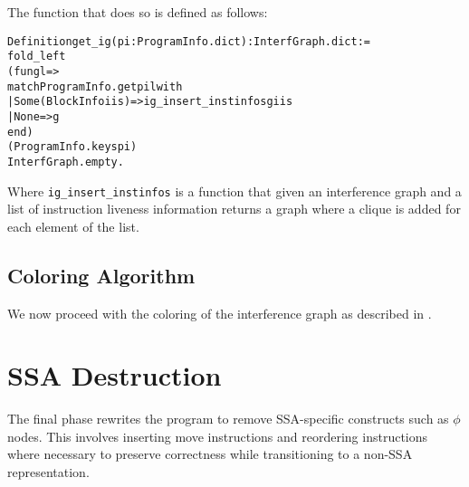 The function that does so is defined as follows:

\begin{alltt}
Definition get_ig (pi : ProgramInfo.dict) : InterfGraph.dict :=
  fold_left
    (fun g l =>
      match ProgramInfo.get pi l with
      | Some (BlockInfo iis) => ig_insert_instinfos g iis
      | None => g
      end)
    (ProgramInfo.keys pi)
    InterfGraph.empty.
\end{alltt}

Where \texttt{ig\_insert\_instinfos} is a function that given an interference graph and a list of instruction liveness information returns a graph where a clique is added for each element of the list.

\subsection{Coloring Algorithm}

We now proceed with the coloring of the interference graph as described in .

\section{SSA Destruction}

The final phase rewrites the program to remove SSA-specific constructs such as $\phi$ nodes. This involves inserting move instructions and reordering instructions where necessary to preserve correctness while transitioning to a non-SSA representation.